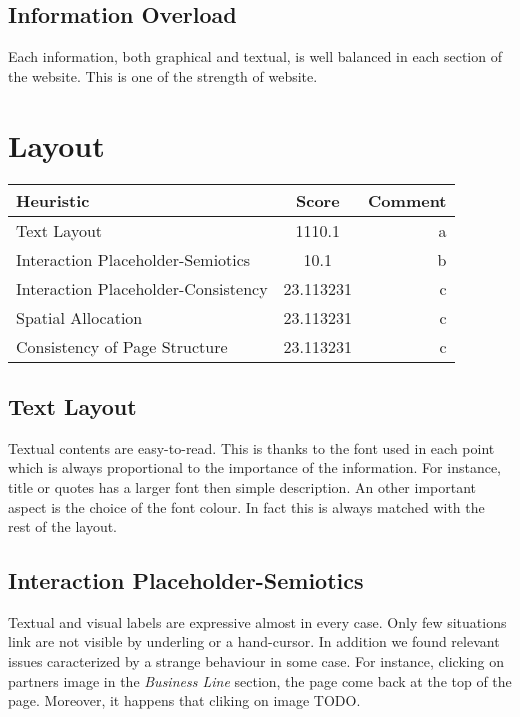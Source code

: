 \subsection{Information Overload}
Each information, both graphical and textual, is well balanced in each section of the website. This is one of the strength of website.
\section{Layout}

\begin{table}[H]
  \begin{center}
    \label{tab:table1}
    \begin{tabular}{l|c|r} %
      \textbf{Heuristic} & \textbf{Score} & \textbf{Comment}\\
      
      \hline
      Text Layout & 1110.1 & a\\
      Interaction Placeholder-Semiotics & 10.1 & b\\
      Interaction Placeholder-Consistency & 23.113231 & c\\
      Spatial Allocation & 23.113231 & c\\
      Consistency of Page Structure & 23.113231 & c\\

    \end{tabular}
  \end{center}
\end{table}

\subsection{Text Layout}
Textual contents are easy-to-read. This is thanks to the font used in each point which is always proportional to the importance of the information. For instance, title or quotes has a larger font then simple description. An other important aspect is the choice of the font colour. In fact this is always matched with the rest of the layout.
\subsection{Interaction Placeholder-Semiotics}
Textual and visual labels are expressive almost in every case. Only few situations link are not visible by underling or a hand-cursor. In addition we found relevant issues caracterized by a strange behaviour in some case. For instance, clicking on partners image in the \textit{Business Line} section, the page come back at the top of the page. Moreover, it happens that cliking on image TODO.
